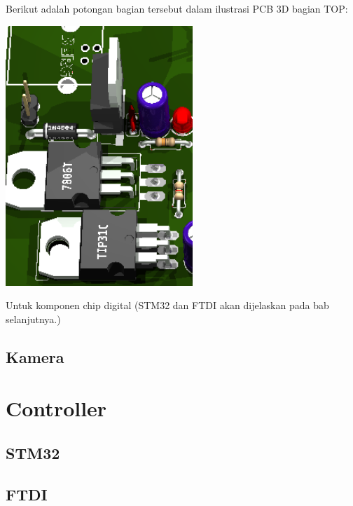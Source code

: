 \documentclass[11pt,fleqn]{book} %
\begin{document}
\begin{flushleft}
\begin{center}
\end{center}
Berikut adalah potongan bagian tersebut dalam ilustrasi PCB 3D bagian TOP:
\begin{center}
 \includegraphics[width=200pt]{./screenshot/pcb/eagle8}\\
\end{center}
\vspace{5pt}
\hspace{10pt} Untuk komponen chip digital (STM32 dan FTDI akan dijelaskan pada bab selanjutnya.)
\end{flushleft}

\section{Kamera}
\begin{flushleft}
 
\end{flushleft}

\newpage
{} %
\chapter{Controller}
\section{STM32}

\section{FTDI}

\newpage
{} %
\end{document}
